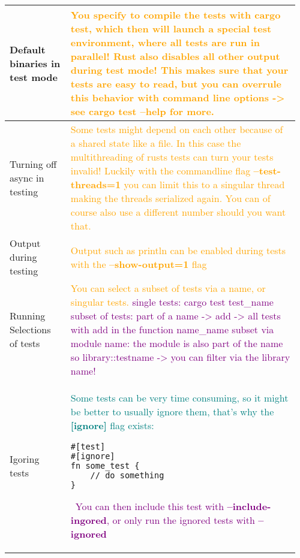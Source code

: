 \documentclass[main.tex,fontsize=8pt,paper=a4,paper=portrait,DIV=calc,]{scrartcl}
\begin{document}
\begin{table}[ht!]
\begin{tabular}{|m{0.2\linewidth}|m{0.755\linewidth}|}
\hline
Default binaries in test mode & 
\textcolor{orange}{You specify to compile the tests with \textbf{cargo test}, which then will launch a special test environment, where \textbf{all tests are run in parallel!}\newline
Rust also \textbf{disables all other output during test mode!} This makes sure that your tests are easy to read, but you can overrule this behavior with command line options -> see cargo test --help for more.}\\
\hline
Turning off async in testing & 
\textcolor{orange}{Some tests might depend on each other because of a shared state like a file. In this case the multithreading of rusts tests can turn your tests invalid!\newline
  Luckily with the commandline flag \textbf{--test-threads=1} you can limit this to a singular thread making the threads serialized again.\newline
You can of course also use a different number should you want that.}\\
\hline
Output during testing & 
\textcolor{orange}{Output such as println can be enabled during tests with the \textbf{--show-output=1} flag}\\
\hline
Running Selections of tests & 
\textcolor{orange}{You can select a subset of tests via a name, or singular tests.}\newline
\textcolor{purple}{single tests: cargo test test\_name}\newline
\textcolor{purple}{subset of tests: part of a name -> add -> all tests with add in the function name\_name}\newline
\textcolor{purple}{subset via module name: the module is also part of the name so library::testname -> you can filter via the library name!}\\
\hline
Igoring tests & 
\textcolor{teal}{Some tests can be very time consuming, so it might be better to usually ignore them, that's why the \textbf{[ignore]} flag exists:}\newline
\begin{lstlisting}
#[test]
#[ignore]
fn some_test {
    // do something
}
\end{lstlisting}
\, \newline
\textcolor{purple}{You can then include this test with \textbf{--include-ingored},\newline
or only run the ignored tests with \textbf{--ignored}}\\

\end{tabular}
\end{table}
\end{document}
